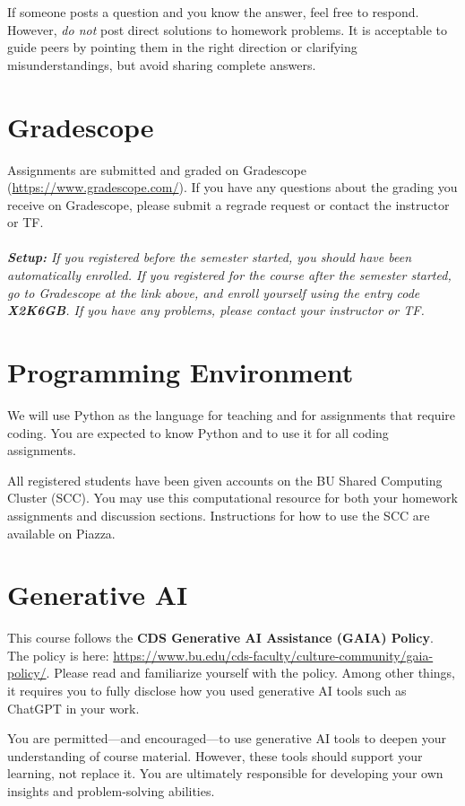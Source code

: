 \documentclass[11pt]{article}
\begin{document}
If someone posts a question and you know the answer, feel free to respond. However, \emph{do not} post direct solutions to homework problems. It is acceptable to guide peers by pointing them in the right direction or clarifying misunderstandings, but avoid sharing complete answers.

\section*{Gradescope}

Assignments are submitted and graded on Gradescope
(\url{https://www.gradescope.com/}). If you have any questions
about the grading you receive on Gradescope, please submit a regrade request or contact the instructor or TF.
\\
~\\\emph{\textbf{Setup:} If you registered before the semester started, you should have been automatically enrolled. If you registered for the course after the semester started, go to Gradescope at the link above, and enroll yourself using the entry code {\bf X2K6GB}. If you have any problems, please contact your instructor or TF.}

\section*{Programming Environment}

We will use Python as the language for teaching and for
assignments that require coding. You are expected to know Python and
to use it for all coding assignments.

All registered students have been given accounts on the BU Shared Computing Cluster (SCC). You may use this computational resource for both your homework assignments and discussion sections. Instructions for how to use the SCC are available on Piazza.

\section*{Generative AI}

This course follows the \textbf{CDS Generative AI Assistance (GAIA) Policy}. The policy is here:
\url{https://www.bu.edu/cds-faculty/culture-community/gaia-policy/}.
Please read and familiarize yourself with the policy.  Among other
things, it requires you to fully disclose how you used generative AI
tools such as ChatGPT in your work. 

You are permitted—and encouraged—to use generative AI tools to deepen your understanding of course material. However, these tools should support your learning, not replace it. You are ultimately responsible for developing your own insights and problem-solving abilities.
\end{document}
